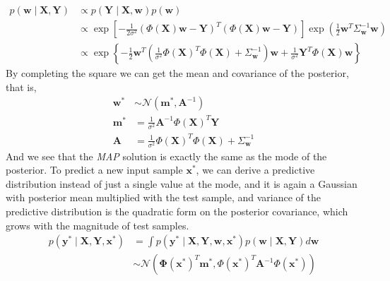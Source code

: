 \documentclass{article}
\newcommand{\vct}[1]{\ensuremath{\boldsymbol{#1}}} %
\newcommand{\set}[1]{\ensuremath{\mathcal{#1}}}
\begin{document}
\begin{align}
p\left( \vct w \mid \vct X, \vct Y \right) & \propto p\left( \vct Y \mid \vct X, \vct w \right)p\left( \vct w \right)  \nonumber\\
& \propto \exp \left\lbrack -\frac{1}{2\sigma^2}\left( \Phi(\vct X)\vct w - \vct Y\right)^T\left( \Phi(\vct X)\vct w - \vct Y\right) \right\rbrack \exp \left( \frac{1}{2}\vct w^T\Sigma_{\vct w}^{-1}\vct w \right)  \nonumber\\
& \propto \exp\left\{ -\frac{1}{2}\vct w^T\left( \frac{1}{\sigma^2}\Phi(\vct X)^T \Phi(\vct X) + \Sigma_{\vct w}^{-1}\right)\vct w + \frac{1}{\sigma^2}\vct Y^T\Phi(\vct X)\vct w \right\}
\end{align}
By completing the square we can get the mean and covariance of the posterior, that is, 
\begin{align}
 \vct w^* &\sim\set N \left( \vct m^*,  \vct A^{-1} \right) \nonumber \\
 \vct m^* &= \frac{1}{\sigma^2} \vct A^{-1} \Phi(\vct X)^T\vct Y \\
  \vct A  &= \frac{1}{\sigma^2}\Phi(\vct X)^T\Phi(\vct X)+\Sigma_{\vct w}^{-1}
\end{align}
And we see that the \textit{MAP} solution is exactly the same as the mode of the posterior. To predict a new input sample $ \vct x^* $, we can derive a predictive distribution instead of just a single value at the mode, and it is again a Gaussian with posterior mean multiplied with the test sample, and variance of the predictive distribution is the quadratic form on the posterior covariance, which grows with the magnitude of test samples. 
\begin{align} 
	p(\vct y^* \mid \vct X, \vct Y, \vct x^*) & = \int p(\vct y^*\mid \vct X, \vct Y, \vct w, \vct x^*)p(\vct w \mid \vct X, \vct Y)d\vct w  \nonumber \\
	& \sim \set N\left( \vct \Phi(\vct x^*)^T \vct m^*, \Phi(\vct x^*)^T \vct A^{-1} \Phi(\vct x^*) \right)
\end{align}
\end{document}
